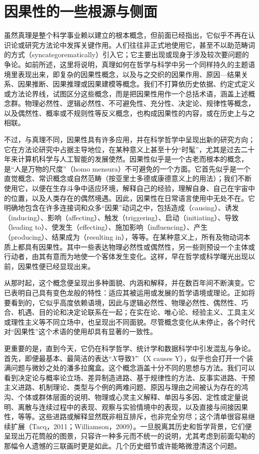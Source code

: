 \section{因果性的一些根源与侧面}

虽然真理是整个科学事业赖以建立的根本概念，但前面已经指出，它似乎不再在认识论或研究方法论中发挥关键作用。人们往往非正式地使用它，甚至不以助范畴词的方式（syncategorematically）引入它；它主要出现或现身于涉及较次要问题的争论。如前所述，这里将说明，真理如何在哲学与科学中另一个同样持久的主题语境里表现出来，即复杂的因果性概念，以及与之交织的因果作用、原因—结果关系、因果推断、因果推理或因果建模等概念。我们不打算依历史依据、约定式定义或方法论界线，试图区分这些概念，而是把因果性用作一个总括术语，涵盖上述概念群。物理必然性、逻辑必然性、不可避免性、充分性、决定论、规律性等概念，以及偶然性、概率或不规则性等反义概念，也构成因果性的内容，或在历史上与之相联。

不过，与真理不同，因果性具有许多应用，并在科学哲学中呈现出新的研究方向；它在方法论研究中占据主导地位，在某种意义上甚至十分“时髦”，尤其是过去二十年来计算机科学与人工智能的发展使然。因果性似乎是一个古老而根本的概念，是“人是万物的尺度”（homo mensura）不可避免的一个方面。它首先似乎是一个直觉概念、常识概念或自然范畴（按亚里士多德或康德意义上的用法）；我们不断使用它，以便在生存斗争中适应环境，解释自己的经验，理解自身、自己在宇宙中的位置，以及人类存在的偶然境遇。因此，因果性在日常语言使用中无处不在。它明确地包含在许多连接词和众多“因果”动词之中，包括造成（causing）、诱发（inducing）、影响（affecting）、触发（triggering）、启动（initiating）、导致（leading to）、使发生（effecting）、施加影响（influencing）、产生（producing）、结果成为（resulting in），等等。在某种意义上，所有及物动词本质上都具有因果性。其中一些表达物理必然性或偶然性，另一些则预设一个主体或行动者，由其有意而为地使一个客体发生变化。这样，早在哲学或科学曙光出现以前，因果性便已经显现出来。

从那时起，这个概念便呈现出多种面貌、内涵和解释，并在数百年间不断演变。它已表明自己具有变色龙般的特性：适应其被运用或发展的哲学语境或理论。正如将要看到的，它似乎高度依赖语境，因此与逻辑必然性、物理必然性、偶然性、巧合、机遇、目的论和决定论联系在一起；在实在论、唯心论、经验主义、工具主义或理性主义等不同立场中，也呈现出不同面貌。尽管概念变化从未停止，各个时代对“因果性”这个术语的使用却具有显著的一致性。

更重要的是，直到今天，它仍在科学哲学、统计学和数据科学中引发混乱与争论。首先，即便最基本、最简洁的表达“$X$导致$Y$”（X causes Y），似乎也会打开一个装满问题与微妙之处的潘多拉魔盒。这个概念涵盖十分不同的思想与方法。我们可以看到决定论与概率论立场、差异制造进路、基于规律性的方法、反事实进路、干预主义进路、机制理论、类型与个例的两难问题、原因与理由之间被认为存在的鸿沟、个体或群体层面的说明、物理或心灵主义解释、单因与多因、定性或定量说明、离散与连续过程中的表现、观察与实验情境中的表现，以及直接与间接因果性，等等。这些进路或解释显然既非相互排斥，也非完全穷尽；这个清单很容易继续扩展（Tacq，2011；Williamson，2009）。一旦脱离其历史和哲学背景，它们便呈现出万花筒般的图景，只容许一种多元而不统一的说明，尤其考虑到前面勾勒的那幅令人遗憾的三联画时更是如此。几个历史细节或许能略微澄清这个问题。

